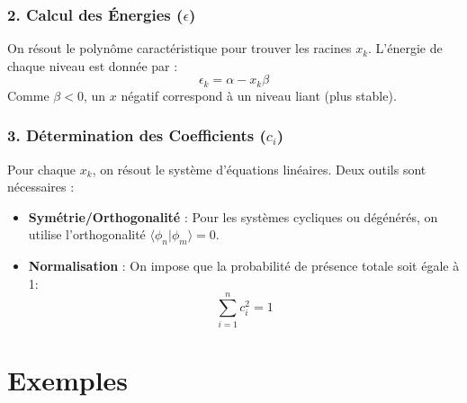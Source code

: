 \documentclass[french]{yLectureNote}
\begin{document}
\subsubsection{2. Calcul des Énergies ($\epsilon$)}
On résout le polynôme caractéristique pour trouver les racines $x_k$. L'énergie de chaque niveau est donnée par :
\[ \epsilon_k = \alpha - x_k \beta \]
Comme $\beta < 0$, un $x$ négatif correspond à un niveau liant (plus stable).

\subsubsection{3. Détermination des Coefficients ($c_i$)}
Pour chaque $x_k$, on résout le système d'équations linéaires. Deux outils sont nécessaires :
\begin{itemize}
    \item \textbf{Symétrie/Orthogonalité} : Pour les systèmes cycliques ou dégénérés, on utilise l'orthogonalité $\langle \phi_n | \phi_m \rangle = 0$.
    \item \textbf{Normalisation} : On impose que la probabilité de présence totale soit égale à 1:
    \[ \sum_{i=1}^n c_i^2 = 1 \]
\end{itemize}
\section{Exemples}
\end{document}

